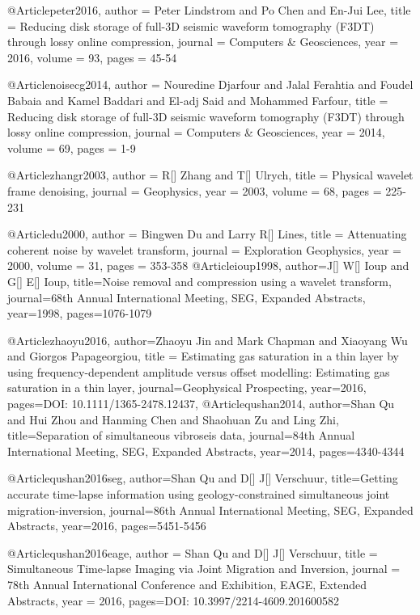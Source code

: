 @Article{peter2016,
  author = 	 {Peter Lindstrom and Po Chen and En-Jui Lee},
  title = 	 {Reducing disk storage of full-3{D} seismic waveform tomography ({F3DT}) through lossy online compression},
  journal = 	 { Computers \& Geosciences},
  year = 	 2016,
  volume = 	 93,
  pages = 	 {45-54}} 
  
 @Article{noisecg2014,
  author = 	 {Nouredine Djarfour and Jalal Ferahtia and Foudel Babaia and Kamel Baddari and El-adj Said and Mohammed Farfour},
  title = 	 {Reducing disk storage of full-3{D} seismic waveform tomography (F3DT) through lossy online compression},
  journal = 	 { Computers \& Geosciences},
  year = 	 2014,
  volume = 	 69,
  pages = 	 {1-9}} 
  


@Article{zhangr2003,
  author = 	 {R[] Zhang and T[] Ulrych},
  title = 	 {Physical wavelet frame denoising},
  journal = 	 {Geophysics},
  year = 	 2003,
  volume = 	 68,
  pages = 	 {225-231}}

@Article{du2000,
  author = 	 {Bingwen Du and Larry R[] Lines},
  title = 	 {Attenuating coherent noise by wavelet transform},
  journal = 	 {Exploration Geophysics},
  year = 	 2000,
  volume = 	 31,
  pages = 	 {353-358}}
@Article{ioup1998,
  author={J[] W[] Ioup and G[] E[] Ioup},
  title={Noise removal and compression using a wavelet transform},
  journal={68th Annual International Meeting, SEG, Expanded Abstracts},
  year=1998,
  pages={1076-1079}
}

@Article{zhaoyu2016,
  author={Zhaoyu Jin and Mark Chapman and Xiaoyang Wu and Giorgos Papageorgiou},
  title = {Estimating gas saturation in a thin layer by using frequency-dependent amplitude versus offset modelling: Estimating gas saturation in a thin layer},
  journal={Geophysical Prospecting},
  year=2016,
  pages={DOI: 10.1111/1365-2478.12437},
}
@Article{qushan2014,
  author={Shan Qu and Hui Zhou and Hanming Chen and Shaohuan Zu and Ling Zhi},
  title={Separation of simultaneous vibroseis data},
  journal={84th Annual International Meeting, SEG, Expanded Abstracts},
  year=2014,
  pages={4340-4344}
}

@Article{qushan2016seg,
  author={Shan Qu and D[] J[] Verschuur},
  title={Getting accurate time-lapse information using geology-constrained simultaneous joint migration-inversion},
  journal={86th Annual International Meeting, SEG, Expanded Abstracts},
  year=2016,
  pages={5451-5456}
}


@Article{qushan2016eage,
  author = 	 {Shan Qu and D[] J[] Verschuur},
  title = 	 {Simultaneous Time-lapse Imaging via Joint Migration and Inversion},
  journal = 	 { 78th Annual International Conference and Exhibition, EAGE, Extended Abstracts},
  year = 	 2016,
  pages={DOI: 10.3997/2214-4609.201600582}}
  

